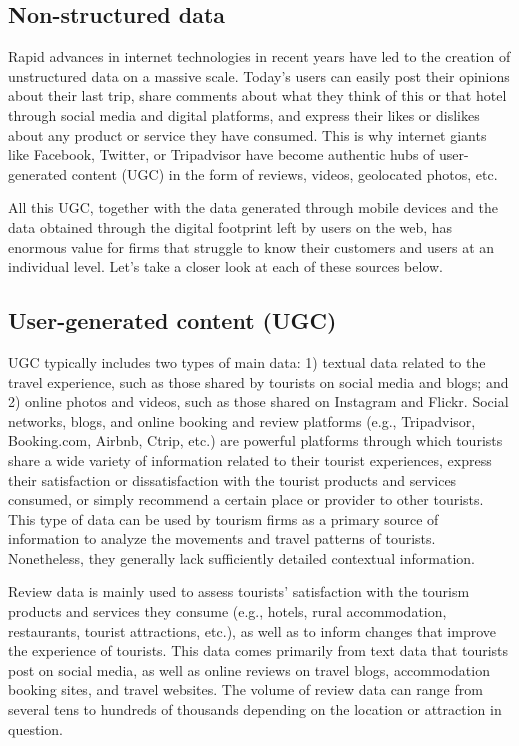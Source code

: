 \documentclass[
  letterpaper,
  DIV=11,
  numbers=noendperiod]{scrreprt}
\begin{document}
\hypertarget{non-structured-data}{%
\subsection{Non-structured data}\label{non-structured-data}}

Rapid advances in internet technologies in recent years have led to the
creation of unstructured data on a massive scale. Today's users can
easily post their opinions about their last trip, share comments about
what they think of this or that hotel through social media and digital
platforms, and express their likes or dislikes about any product or
service they have consumed. This is why internet giants like Facebook,
Twitter, or Tripadvisor have become authentic hubs of user-generated
content (UGC) in the form of reviews, videos, geolocated photos, etc.

All this UGC, together with the data generated through mobile devices
and the data obtained through the digital footprint left by users on the
web, has enormous value for firms that struggle to know their customers
and users at an individual level. Let's take a closer look at each of
these sources below.

\hypertarget{user-generated-content-ugc}{%
\subsection{User-generated content
(UGC)}\label{user-generated-content-ugc}}

UGC typically includes two types of main data: 1) textual data related
to the travel experience, such as those shared by tourists on social
media and blogs; and 2) online photos and videos, such as those shared
on Instagram and Flickr. Social networks, blogs, and online booking and
review platforms (e.g., Tripadvisor, Booking.com, Airbnb, Ctrip, etc.)
are powerful platforms through which tourists share a wide variety of
information related to their tourist experiences, express their
satisfaction or dissatisfaction with the tourist products and services
consumed, or simply recommend a certain place or provider to other
tourists. This type of data can be used by tourism firms as a primary
source of information to analyze the movements and travel patterns of
tourists. Nonetheless, they generally lack sufficiently detailed
contextual information.

Review data is mainly used to assess tourists' satisfaction with the
tourism products and services they consume (e.g., hotels, rural
accommodation, restaurants, tourist attractions, etc.), as well as to
inform changes that improve the experience of tourists. This data comes
primarily from text data that tourists post on social media, as well as
online reviews on travel blogs, accommodation booking sites, and travel
websites. The volume of review data can range from several tens to
hundreds of thousands depending on the location or attraction in
question.
\end{document}
